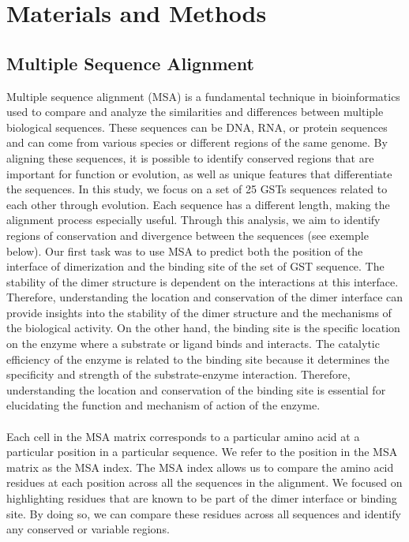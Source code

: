 \chapter{Materials and Methods}
\section{Multiple Sequence Alignment}
Multiple sequence alignment (MSA) is a fundamental technique in bioinformatics used to compare and analyze the similarities and differences between multiple biological sequences. These sequences can be DNA, RNA, or protein sequences and can come from various species or different regions of the same genome. By aligning these sequences, it is possible to identify conserved regions that are important for function or evolution, as well as unique features that differentiate the sequences.
In this study, we focus on a set of 25 GSTs sequences related to each other through evolution. Each sequence has a different length, making the alignment process especially useful. Through this analysis, we aim to identify regions of conservation and divergence between the sequences (see exemple below). Our first task was to use MSA to predict both the position of the interface of dimerization and the binding site of the set of GST sequence. The stability of the dimer structure is dependent on the interactions at this interface. Therefore, understanding the location and conservation of the dimer interface can provide insights into the stability of the dimer structure and the mechanisms of the biological activity. On the other hand, the binding site is the specific location on the enzyme where a substrate or ligand binds and interacts. The catalytic efficiency of the enzyme is related to the binding site because it determines the specificity and strength of the substrate-enzyme interaction. Therefore, understanding the location and conservation of the binding site is essential for elucidating the function and mechanism of action of the enzyme.\\
\\
\noindent Each cell in the MSA matrix corresponds to a particular amino acid at a particular position in a particular sequence. We refer to the position in the MSA matrix as the MSA index. The MSA index allows us to compare the amino acid residues at each position across all the sequences in the alignment. We focused on highlighting residues that are known to be part of the dimer interface or binding site. By doing so, we can compare these residues across all sequences and identify any conserved or variable regions.

